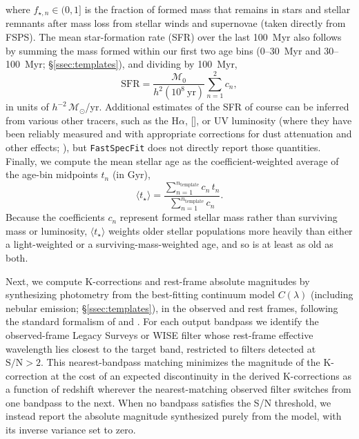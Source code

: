 \documentclass[modern,linenumbers]{aastex702}
\newcommand{\fastspecfit}{\texttt{FastSpecFit}}
\newcommand{\oii}{[\ion{O}{2}]}
\newcommand{\ha}{\ensuremath{\mathrm{H}\alpha}}
\newcommand{\msun}{\ensuremath{\mathcal{M}_{\odot}}}
\begin{document}
\noindent where $f_{\star,n}\in(0,1]$ is the fraction of formed mass
  that
    remains in stars and stellar remnants after mass loss from stellar
    winds and supernovae (taken directly
  from FSPS). The mean star-formation rate (SFR) over the last 100~Myr
  also follows by summing the mass formed within our first two age
  bins (0--30~Myr and 30--100~Myr; \S\ref{ssec:templates}), and
  dividing by 100~Myr,
\begin{equation}
  \mathrm{SFR} = \frac{\mathcal{M}_0}{h^{2}(10^{8}~\mathrm{yr})}\sum_{n=1}^{2} c_n,
  \label{eq:sfr}
\end{equation}
\noindent in units of $h^{-2}\,\msun$/yr.
Additional estimates of the SFR of course can be inferred from various
other tracers, such as the \ha, \oii, or UV luminosity (where they
have been reliably measured and with appropriate corrections for dust
attenuation and other effects; \citealt{moustakas06b, kennicutt98a,
  hao11a}), but \fastspecfit{} does not directly report those
quantities. Finally, we compute the mean stellar age as the
coefficient-weighted average of the age-bin midpoints $t_n$ (in Gyr),
\begin{equation}
  \langle t_\star\rangle = \frac{\sum_{n=1}^{n_\mathrm{template}}
    c_n\,t_n}{\sum_{n=1}^{n_\mathrm{template}} c_n}.
  \label{eq:age}
\end{equation}
Because the coefficients $c_n$ represent formed stellar mass rather
than surviving mass or luminosity, $\langle t_\star\rangle$
weights
older stellar populations more heavily than either a light-weighted
or a surviving-mass-weighted age, and so is at least as old as both.

Next, we compute K-corrections and rest-frame absolute magnitudes by
synthesizing photometry from the best-fitting continuum model
$C(\lambda)$ (including nebular emission; \S\ref{ssec:templates}), in
the observed and rest frames, following the standard formalism of
\citet{hogg02a} and \citet{blanton03a}. For each output bandpass we
identify the observed-frame Legacy Surveys or WISE filter whose
rest-frame effective wavelength lies closest to the target band,
restricted to filters detected at $\mathrm{S/N}>2$. This
nearest-bandpass matching minimizes the magnitude of the K-correction
at the cost of an expected discontinuity in the derived K-corrections
as a function of redshift wherever the nearest-matching observed
filter switches from one bandpass to the next.
When no bandpass satisfies the S/N threshold, we instead report the
absolute magnitude synthesized purely from the model, with its inverse
variance set to zero.
\end{document}
